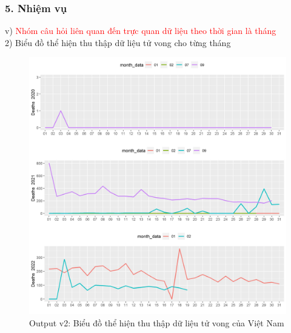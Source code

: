 \documentclass[english,10pt,table]{beamer}
\begin{document}
\begin{frame}[fragile]
\frametitle{5.  Nhiệm vụ}
v) \textcolor{red}{Nhóm câu hỏi liên quan đến trực quan dữ liệu theo thời gian là tháng}\\
    2) Biểu đồ thể hiện thu thập dữ liệu tử vong cho từng tháng
	\begin{figure}[h!]
	\begin{center}
		    \includegraphics[scale = 0.28]{Images/V/v2 Vietnam .jpeg}
		     \caption{Output v2: Biểu đồ thể hiện thu thập dữ liệu tử vong của Việt Nam}
		\end{center}
		\end{figure}
\end{frame}
\end{document}
